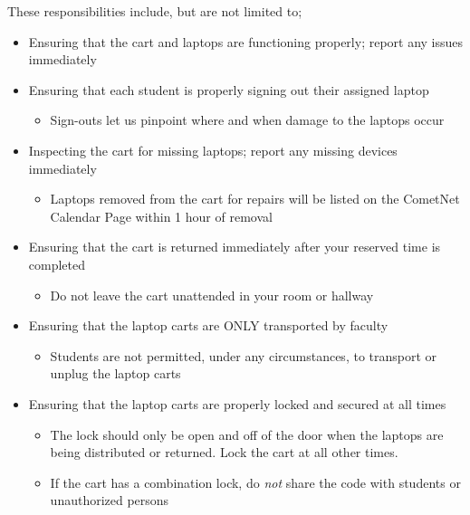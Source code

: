 \begin{titlepage}
\small 
These responsibilities include, but are not limited to;
\begin{itemize}
\item Ensuring that the cart and laptops are functioning properly; report any issues immediately
\item Ensuring that each student is properly signing out their assigned laptop
\begin{itemize}
\item Sign-outs let us pinpoint where and when damage to the laptops occur
\end{itemize}
\item Inspecting the cart for missing laptops; report any missing devices immediately
\begin{itemize}
\item Laptops removed from the cart for repairs will be listed on the CometNet Calendar Page within 1 hour of removal
\end{itemize}
\item Ensuring that the cart is returned immediately after your reserved time is completed
\begin{itemize}
\item Do not leave the cart unattended in your room or hallway
\end{itemize}
\item Ensuring that the laptop carts are ONLY transported by faculty
\begin{itemize}
\item Students are not permitted, under any circumstances, to transport or unplug the laptop carts
\end{itemize}
\item Ensuring that the laptop carts are properly locked and secured at all times
\begin{itemize}
\item The lock should only be open and off of the door when the laptops are being distributed or returned. Lock the cart at all other times. 
\item If the cart has a combination lock, do \emph{not} share the code with students or unauthorized persons
\end{itemize}
\end{itemize}
\end{titlepage}
